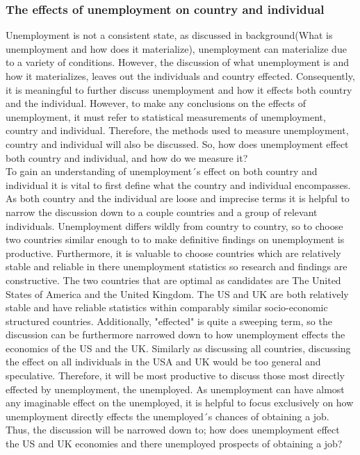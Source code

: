 \subsubsection{The effects of unemployment on country and individual}
Unemployment is not a consistent state, as discussed in background(What is unemployment and how does it materialize), unemployment can materialize due to a variety of conditions.
However, the discussion of what unemployment is and how it materializes, leaves out the individuals and country effected.
Consequently, it is meaningful to further discuss unemployment and how it effects both country and the individual.
However, to make any conclusions on the effects of unemployment, it must refer to statistical measurements of unemployment, country and individual. 
Therefore, the methods used to measure unemployment, country and individual will also be discussed.
So, how does unemployment effect both country and individual, and how do we measure it? \\

To gain an understanding of unemployment´s effect on both country and individual it is vital to first define what the country and individual encompasses.
As both country and the individual are loose and imprecise terms it is helpful to narrow the discussion down to a couple countries and a group of relevant individuals.
Unemployment differs wildly from country to country, so to choose two countries similar enough to to make definitive findings on unemployment is productive.
Furthermore, it is valuable to choose countries which are relatively stable and reliable in there unemployment statistics so research and findings are constructive.
The two countries that are optimal as candidates are The United States of America and the United Kingdom.
The US and UK are both relatively stable and have reliable statistics within comparably similar socio-economic structured countries. \cite{Economic_similarities_US_UK}
Additionally, "effected" is quite a sweeping term, so the discussion can be furthermore narrowed down to how unemployment effects the economics of the US and the UK.
Similarly as discussing all countries, discussing the effect on all individuals in the USA and UK would be too general and speculative.
Therefore, it will be most productive to discuss those most directly effected by unemployment, the unemployed.
As unemployment can have almost any imaginable effect on the unemployed, it is helpful to focus exclusively on how unemployment directly effects the unemployed´s chances of obtaining a job.
Thus, the discussion will be narrowed down to; how does unemployment effect the US and UK economies and there unemployed prospects of obtaining a job? \\

